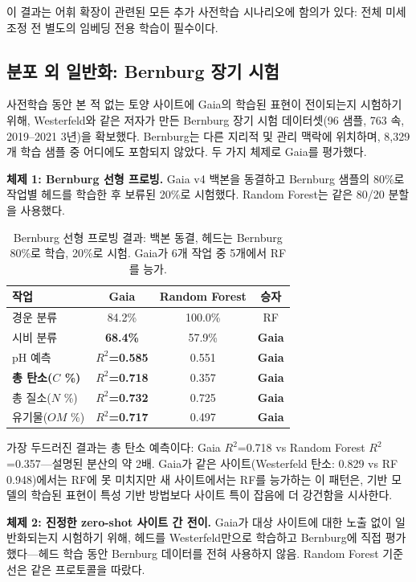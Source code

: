 \documentclass[11pt,a4paper]{article}
\begin{document}
이 결과는 어휘 확장이 관련된 모든 추가 사전학습 시나리오에 함의가 있다: 전체 미세 조정 전 별도의 임베딩 전용 학습이 필수이다.

\subsection{분포 외 일반화: Bernburg 장기 시험}

사전학습 동안 본 적 없는 토양 사이트에 Gaia의 학습된 표현이 전이되는지 시험하기 위해, Westerfeld와 같은 저자가 만든 Bernburg 장기 시험 데이터셋(96 샘플, 763 속, 2019--2021 3년)을 확보했다. Bernburg는 다른 지리적 및 관리 맥락에 위치하며, 8,329개 학습 샘플 중 어디에도 포함되지 않았다. 두 가지 체제로 Gaia를 평가했다.

\textbf{체제 1: Bernburg 선형 프로빙.} Gaia v4 백본을 동결하고 Bernburg 샘플의 80\%로 작업별 헤드를 학습한 후 보류된 20\%로 시험했다. Random Forest는 같은 80/20 분할을 사용했다.

\begin{table}[H]
\centering
\caption{Bernburg 선형 프로빙 결과: 백본 동결, 헤드는 Bernburg 80\%로 학습, 20\%로 시험. Gaia가 6개 작업 중 5개에서 RF를 능가.}
\label{tab:bernburg_lp}
\begin{tabular}{lccc}
\toprule
\textbf{작업} & \textbf{Gaia} & \textbf{Random Forest} & \textbf{승자} \\
\midrule
경운 분류 & 84.2\% & 100.0\% & RF \\
시비 분류 & \textbf{68.4\%} & 57.9\% & \textbf{Gaia} \\
pH 예측 & \textbf{$R^2$=0.585} & 0.551 & \textbf{Gaia} \\
\textbf{총 탄소($C$ \%)} & \textbf{$R^2$=0.718} & 0.357 & \textbf{Gaia} \\
총 질소($N$ \%) & \textbf{$R^2$=0.732} & 0.725 & \textbf{Gaia} \\
유기물($OM$ \%) & \textbf{$R^2$=0.717} & 0.497 & \textbf{Gaia} \\
\bottomrule
\end{tabular}
\end{table}

가장 두드러진 결과는 총 탄소 예측이다: Gaia $R^2$=0.718 vs Random Forest $R^2$=0.357---설명된 분산의 약 2배. Gaia가 같은 사이트(Westerfeld 탄소: 0.829 vs RF 0.948)에서는 RF에 못 미치지만 새 사이트에서는 RF를 능가하는 이 패턴은, 기반 모델의 학습된 표현이 특성 기반 방법보다 사이트 특이 잡음에 더 강건함을 시사한다.

\textbf{체제 2: 진정한 zero-shot 사이트 간 전이.} Gaia가 대상 사이트에 대한 노출 없이 일반화되는지 시험하기 위해, 헤드를 Westerfeld만으로 학습하고 Bernburg에 직접 평가했다---헤드 학습 동안 Bernburg 데이터를 전혀 사용하지 않음. Random Forest 기준선은 같은 프로토콜을 따랐다.
\end{document}

